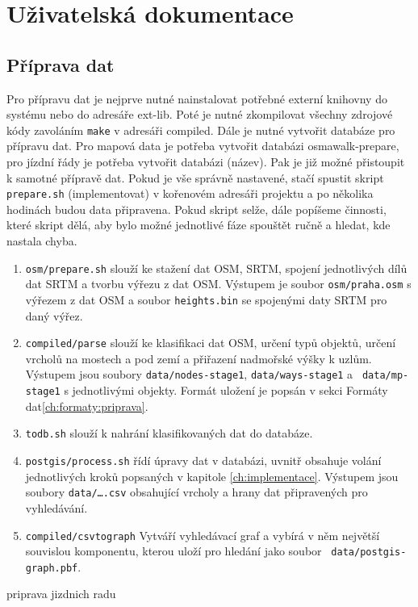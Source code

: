 \chapter{Uživatelská dokumentace}
\section{Příprava dat}
Pro přípravu dat je nejprve nutné nainstalovat potřebné externí knihovny do
systému nebo do adresáře ext-lib. Poté je nutné zkompilovat všechny zdrojové
kódy zavoláním {\tt make} v adresáři compiled. Dále je nutné vytvořit databáze
pro přípravu dat. Pro mapová data je potřeba vytvořit databázi osmawalk-prepare,
pro jízdní řády je potřeba vytvořit databázi (\TODO název). Pak je již možné
přistoupit k samotné přípravě dat. Pokud je vše správně nastavené, stačí spustit
skript {\tt prepare.sh} (\TODO implementovat) v kořenovém adresáři projektu a po několika hodinách
budou data připravena. Pokud skript selže, dále popíšeme činnosti, které skript
dělá, aby bylo možné jednotlivé fáze spouštět ručně a hledat, kde nastala chyba.

\begin{enumerate}
\item {\tt osm/prepare.sh} slouží ke stažení dat OSM, SRTM, spojení jednotlivých
dílů dat SRTM a tvorbu výřezu z dat OSM. Výstupem je soubor {\tt osm/praha.osm}
s výřezem z dat OSM a soubor {\tt heights.bin} se spojenými daty SRTM pro daný
výřez. 
\item {\tt compiled/parse} slouží ke klasifikaci dat OSM, určení typů objektů,
určení vrcholů na mostech a pod zemí a přiřazení nadmořské výšky k uzlům.
Výstupem jsou soubory {\tt data/nodes-stage1}, {\tt data/ways-stage1} a {\tt
data/mp-stage1} s jednotlivými objekty. Formát uložení je popsán v sekci Formáty
dat\ref{ch:formaty:priprava}.
\item {\tt todb.sh} slouží k nahrání klasifikovaných dat do databáze. 
\item {\tt postgis/process.sh} řídí úpravy dat v databázi, uvnitř obsahuje
volání jednotlivých kroků popsaných v kapitole \ref{ch:implementace}.
Výstupem jsou soubory {\tt data/\dots.csv} obsahující vrcholy a hrany dat
připravených pro vyhledávání. 
\item {\tt compiled/csvtograph} Vytváří vyhledávací graf a vybírá v něm největší
souvislou komponentu, kterou uloží pro hledání jako soubor {\tt
data/postgis-graph.pbf}.
\end{enumerate}
\TODO priprava jizdnich radu

